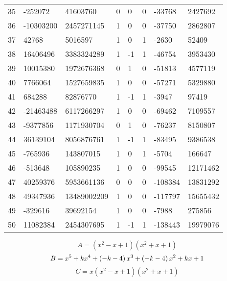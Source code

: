 \documentclass{amsart}
\begin{document}
\begin{longtable}{|l|l|l|lllll|}
35&-252072&41603760&0&0&0&-33768&2427692\\
36&-10303200&2457271145&1&0&0&-37750&2862807\\
37&42768&5016597&1&0&1&-2630&52409\\
38&16406496&3383324289&1&-1&1&-46754&3953430\\
39&10015380&1972676368&0&1&0&-51813&4577119\\
40&7766064&1527659835&1&0&0&-57271&5329880\\
41&684288&82876770&1&-1&1&-3947&97419\\
42&-21463488&6117266297&1&0&0&-69462&7109557\\
43&-9377856&1171930704&0&1&0&-76237&8150807\\
44&36139104&8056876761&1&-1&1&-83495&9386538\\
45&-765936&143807015&1&0&1&-5704&166647\\
46&-513648&105890235&1&0&0&-99545&12171462\\
47&40259376&5953661136&0&0&0&-108384&13831292\\
48&49347936&13489002209&1&0&0&-117797&15655432\\
49&-329616&39692154&1&0&0&-7988&275856\\
50&11082384&2454307695&1&-1&1&-138443&19979076\\
\hline
\end{longtable}
$$A=(x^2
 - x
 + 1)(x^2
 + x
 + 1)$$
$$B=x^5
 + k\*x^4
 + \left(-k
 - 4\right) \*x^3
 + \left(-k
 - 4\right) \*x^2
 + k\*x
 + 1$$
$$C=x(x^2
 - x
 + 1)(x^2
 + x
 + 1)$$
\end{document}

